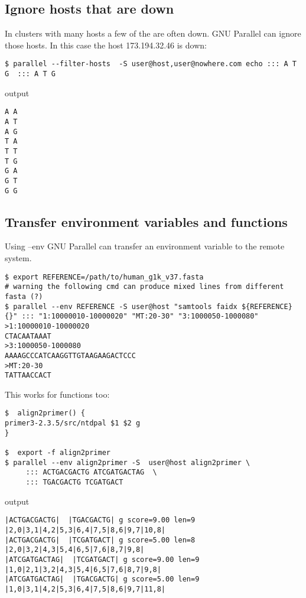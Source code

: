 \documentclass{article}
\begin{document}
\subsection{Ignore hosts that are down}
In clusters with many hosts a few of the are often down. GNU Parallel can ignore those hosts. In this case the host 173.194.32.46 is down:
\begin{lstlisting}
$ parallel --filter-hosts  -S user@host,user@nowhere.com echo ::: A T G  ::: A T G 
\end{lstlisting}
output
\begin{lstlisting}
A A
A T
A G
T A
T T
T G
G A
G T
G G
\end{lstlisting}

\subsection{Transfer environment variables and functions}
Using --env GNU Parallel can transfer an environment variable to the remote system.

\begin{lstlisting}
$ export REFERENCE=/path/to/human_g1k_v37.fasta
# warning the following cmd can produce mixed lines from different fasta (?)
$ parallel --env REFERENCE -S user@host "samtools faidx ${REFERENCE} {}" ::: "1:10000010-10000020" "MT:20-30" "3:1000050-1000080"
>1:10000010-10000020
CTACAATAAAT
>3:1000050-1000080
AAAAGCCCATCAAGGTTGTAAGAAGACTCCC
>MT:20-30
TATTAACCACT
\end{lstlisting}

This works for functions too:

\begin{lstlisting}
$  align2primer() {
primer3-2.3.5/src/ntdpal $1 $2 g
}

$  export -f align2primer
$ parallel --env align2primer -S  user@host align2primer \
	 ::: ACTGACGACTG ATCGATGACTAG  \
	 ::: TGACGACTG TCGATGACT
\end{lstlisting}
output
\begin{lstlisting}
|ACTGACGACTG|  |TGACGACTG| g score=9.00 len=9 |2,0|3,1|4,2|5,3|6,4|7,5|8,6|9,7|10,8|
|ACTGACGACTG|  |TCGATGACT| g score=5.00 len=8 |2,0|3,2|4,3|5,4|6,5|7,6|8,7|9,8|
|ATCGATGACTAG|  |TCGATGACT| g score=9.00 len=9 |1,0|2,1|3,2|4,3|5,4|6,5|7,6|8,7|9,8|
|ATCGATGACTAG|  |TGACGACTG| g score=5.00 len=9 |1,0|3,1|4,2|5,3|6,4|7,5|8,6|9,7|11,8|
\end{lstlisting}
\end{document}
